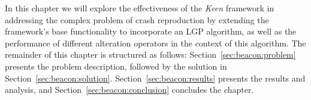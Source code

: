     In this chapter we will explore the effectiveness of the \textit{Keen} framework in addressing the complex problem
    of crash reproduction by extending the framework's base functionality to incorporate an LGP algorithm, as well as
    the performance of different alteration operators in the context of this algorithm. The remainder of this chapter is
    structured as follows: Section~\ref{sec:beacon:problem} presents the problem description, followed by the solution
    in Section~\ref{sec:beacon:solution}. Section~\ref{sec:beacon:results} presents the results and analysis, and
    Section~\ref{sec:beacon:conclusion} concludes the chapter.
    